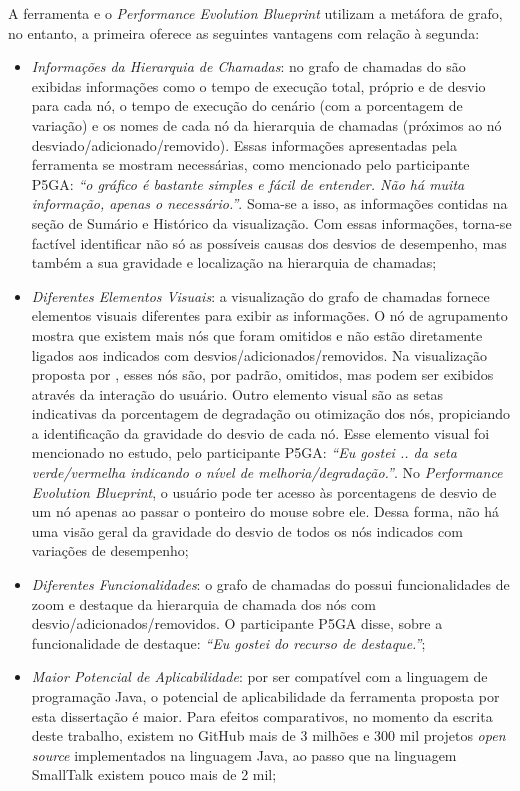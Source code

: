 A ferramenta {\textit{\toolName}} e o \textit{Performance Evolution Blueprint} utilizam a metáfora de grafo, no entanto, a primeira oferece as seguintes vantagens com relação à segunda:
\begin{itemize}
   \item \textit{Informações da Hierarquia de Chamadas}: no grafo de chamadas do {\textit{\toolName}} são exibidas informações como o tempo de execução total, próprio e de desvio para cada nó, o tempo de execução do cenário (com a porcentagem de variação) e os nomes de cada nó da hierarquia de chamadas (próximos ao nó desviado/adicionado/removido). Essas informações apresentadas pela ferramenta se mostram necessárias, como mencionado pelo participante P5GA: \textit{``o gráfico é bastante simples e fácil de entender. Não há muita informação, apenas o necessário.''}. Soma-se a isso, as informações contidas na seção de Sumário e Histórico da visualização. Com essas informações, torna-se factível identificar não só as possíveis causas dos desvios de desempenho, mas também a sua gravidade e localização na hierarquia de chamadas;
   \item \textit{Diferentes Elementos Visuais}: a visualização do grafo de chamadas fornece elementos visuais diferentes para exibir as informações. O nó de agrupamento mostra que existem mais nós que foram omitidos e não estão diretamente ligados aos indicados com desvios/adicionados/removidos. Na visualização proposta por \citeauthor{SandovalAlcocer2013}, esses nós são, por padrão, omitidos, mas podem ser exibidos através da interação do usuário. Outro elemento visual são as setas indicativas da porcentagem de degradação ou otimização dos nós, propiciando a identificação da gravidade do desvio de cada nó. Esse elemento visual foi mencionado no estudo, pelo participante P5GA: \textit{``Eu gostei .. da seta verde/vermelha indicando o nível de melhoria/degradação.''}. No \textit{Performance Evolution Blueprint}, o usuário pode ter acesso às porcentagens de desvio de um nó apenas ao passar o ponteiro do mouse sobre ele. Dessa forma, não há uma visão geral da gravidade do desvio de todos os nós indicados com variações de desempenho;
   \item \textit{Diferentes Funcionalidades}: o grafo de chamadas do {\textit{\toolName}} possui funcionalidades de zoom e destaque da hierarquia de chamada dos nós com desvio/adicionados/removidos. O participante P5GA disse, sobre a funcionalidade de destaque: \textit{``Eu gostei do recurso de destaque.''};
   \item \textit{Maior Potencial de Aplicabilidade}: por ser compatível com a linguagem de programação Java, o potencial de aplicabilidade da ferramenta proposta por esta dissertação é maior. Para efeitos comparativos, no momento da escrita deste trabalho, existem no GitHub mais de 3 milhões e 300 mil projetos \textit{open source} implementados na linguagem Java, ao passo que na linguagem SmallTalk existem pouco mais de 2 mil;

\end{itemize}
